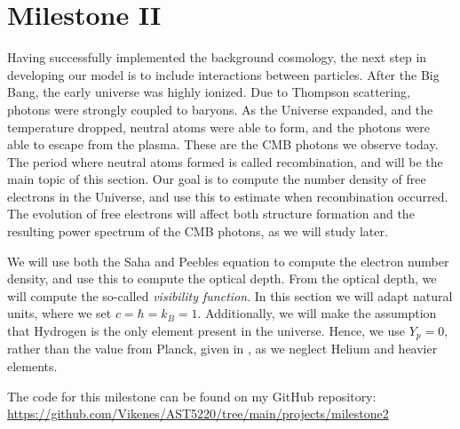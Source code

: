 \section{Milestone II}\label{M2}
Having successfully implemented the background cosmology, the next step in 
developing our model is to include interactions between particles. After the Big Bang, the early universe was highly ionized. Due to Thompson scattering, photons were strongly coupled to baryons. As the Universe expanded, and the temperature dropped, neutral atoms were able to form, and the photons were able to escape from the plasma. These are the CMB photons we observe today. The period where neutral atoms formed is called recombination, and will be the main topic of this section. Our goal is to compute the number density of free electrons in the Universe, and use this to estimate when recombination occurred. The evolution of free electrons will affect both structure formation and the resulting power spectrum of the CMB photons, as we will study later.

We will use both the Saha and Peebles equation to compute the electron number density, and use this to compute the optical depth. From the optical depth, we will compute the so-called \textit{visibility function}. In this section we will adapt natural units, where we set $c=\hbar=k_B=1$. Additionally, we will make the assumption that Hydrogen is the only element present in the universe. Hence, we use $Y_p=0$, rather than the value from Planck, given in , as we neglect Helium and heavier elements.   


The code for this milestone can be found on my GitHub repository: \url{https://github.com/Vikenes/AST5220/tree/main/projects/milestone2}





